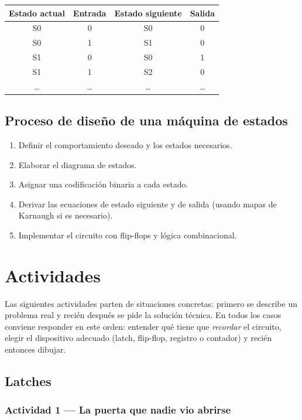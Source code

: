\begin{table}[H]
\centering
\begin{tabular}{cccc}
\toprule
Estado actual & Entrada & Estado siguiente & Salida \\
\midrule
S0 & 0 & S0 & 0 \\
S0 & 1 & S1 & 0 \\
S1 & 0 & S0 & 1 \\
S1 & 1 & S2 & 0 \\
\ldots & \ldots & \ldots & \ldots \\
\bottomrule
\end{tabular}
\end{table}

\subsection{Proceso de diseño de una máquina de estados}

\begin{enumerate}
    \item Definir el comportamiento deseado y los estados necesarios.
    \item Elaborar el diagrama de estados.
    \item Asignar una codificación binaria a cada estado.
    \item Derivar las ecuaciones de estado siguiente y de salida (usando mapas de Karnaugh si es necesario).
    \item Implementar el circuito con flip-flops y lógica combinacional.
\end{enumerate}

\section{Actividades}

Las siguientes actividades parten de situaciones concretas: primero se describe un problema real y recién después se pide la solución técnica. En todos los casos conviene responder en este orden: entender qué tiene que \textit{recordar} el circuito, elegir el dispositivo adecuado (latch, flip-flop, registro o contador) y recién entonces dibujar.

\subsection{Latches}

\subsubsection*{Actividad 1 --- La puerta que nadie vio abrirse}

